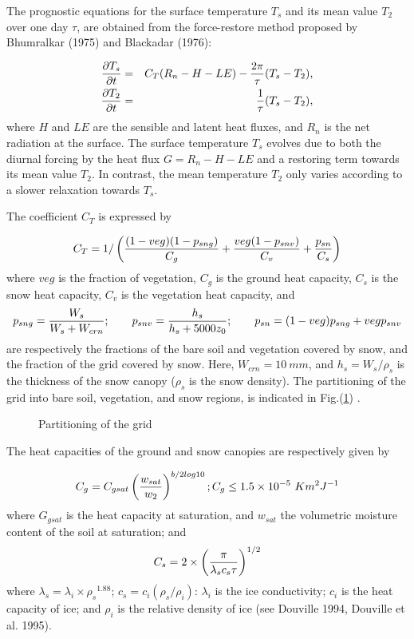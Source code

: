 The prognostic equations for the surface temperature
$T_s$ and its mean value $T_2$ over one day $\tau$,
are obtained from the force-restore method proposed by
Bhumralkar (1975) and Blackadar (1976):

\begin{eqnarray} \label{eqTs}
{\partial T_s \over \partial t}&=&C_T (R_n-H-LE) -
{2 \pi \over \tau} (T_s-T_2),   \\
{\partial T_2 \over \partial t}&=& {1 \over \tau}
(T_s-T_2),
\end{eqnarray}
where $H$ and
$LE$ are the sensible and latent heat fluxes, and
$R_n$ is the net radiation at the surface.
The surface temperature $T_s$ evolves due to both the
diurnal forcing by the heat flux $G = R_n-H-LE$ and
a restoring term towards its mean value $T_2$.
In contrast, the mean temperature $T_2$ only varies
according to a slower relaxation towards $T_s$.

The coefficient $C_T$ is expressed by

\begin{equation}
C_T=1 / \left(  {(1-veg)(1-p_{sng}) \over C_g}
    +       { veg(1-p_{snv}) \over C_v }
    +       { p_{sn} \over C_s } \right)
\end{equation}
where $veg$ is the fraction of vegetation, $C_g$ is the ground heat capacity,
$C_s$ is the snow heat capacity, $C_v$ is the vegetation heat capacity,
and
\begin{eqnarray}
p_{sng} = {W_s \over W_s + W_{crn} }; \ \ \ \ \ \
p_{snv} = { h_s \over h_s + 5000 z_0 }; \ \ \ \ \ \
p_{sn} = (1-veg) p_{sng} + veg p_{snv}
\end{eqnarray}
are respectively the fractions of the bare soil and vegetation
covered by snow, and the fraction of the grid covered by snow.
Here, $W_{crn} = 10 \ mm$, and
$h_s = W_s / \rho_s$ is the thickness of the snow canopy ($\rho_s$ is the
snow density).
The partitioning of the grid into bare soil, vegetation, and snow regions,
is indicated in Fig.(\ref{isba1}) .

\begin{figure}[h]
\caption{Partitioning of the grid \label{isba1}}
\end{figure}

The heat capacities of the ground and snow canopies are
respectively given by

\begin{equation}
C_g=C_{gsat} \left( {w_{sat} \over w_2} \right)^
{b / 2log10} ; C_g \leq 1.5 \times 10^{-5} \ K m^2 J^{-1}
\end{equation}
where $G_{gsat}$ is the heat capacity at saturation, and $w_{sat}$ the
volumetric moisture content of the soil at saturation; and
\begin{equation}
C_s=2 \times \left( {\pi \over \lambda_s c_s \tau}
\right)^{1/2}
\end{equation}
where $\lambda_s = \lambda_i \times {\rho_s}^{1.88}$;
$c_s = c_i (\rho_s / \rho_i)$:
$\lambda_i$ is the ice conductivity;
$c_i$ is the heat capacity
of ice; and $\rho_i$ is the relative density
of ice (see Douville 1994, Douville et al. 1995).
\\

